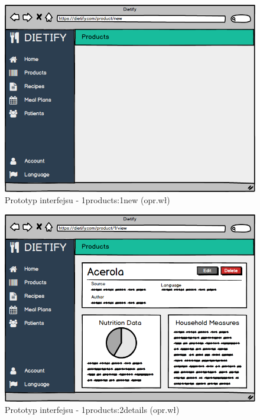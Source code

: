 \begin{minipage}{\textwidth}
    \begin{figure}[H]
        \centering\includegraphics[scale=0.55]{../mockup/1products_1new.png}
        \caption{Prototyp interfejsu - 1products:1new (opr.wł)}\label{rysunek:1products_1new}
    \end{figure}
\end{minipage}
\begin{minipage}{\textwidth}
    \begin{figure}[H]
        \centering\includegraphics[scale=0.55]{../mockup/1products_2details.png}
        \caption{Prototyp interfejsu - 1products:2details (opr.wł)}\label{rysunek:1products_2details}
    \end{figure}
\end{minipage}
